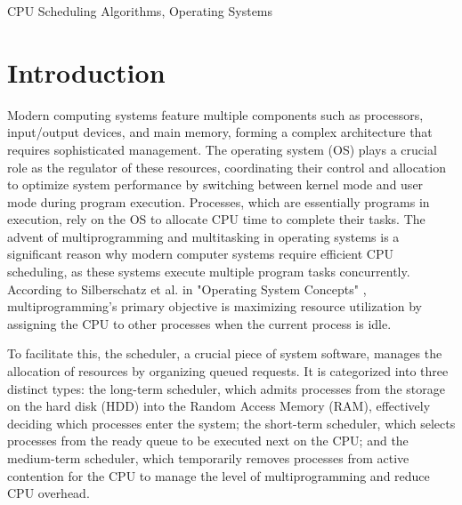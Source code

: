 \documentclass[conference]{IEEEtran}
\begin{document}
\begin{IEEEkeywords}
CPU Scheduling Algorithms, Operating Systems
\end{IEEEkeywords}

\section{\textbf{Introduction}}
Modern computing systems feature multiple components such as processors, input/output devices, and main memory, forming a complex architecture that requires sophisticated management. The operating system (OS) plays a crucial role as the regulator of these resources, coordinating their control and allocation to optimize system performance by switching between kernel mode and user mode during program execution\cite{fayyaz2017comparative}. Processes, which are essentially programs in execution, rely on the OS to allocate CPU time to complete their tasks. The advent of multiprogramming and multitasking in operating systems is a significant reason why modern computer systems require efficient CPU scheduling, as these systems execute multiple program tasks concurrently. According to Silberschatz et al. in "Operating System Concepts" \cite{silberschatz1991operating}, multiprogramming's primary objective is maximizing resource utilization by assigning the CPU to other processes when the current process is idle.

To facilitate this, the scheduler, a crucial piece of system software, manages the allocation of resources by organizing queued requests. It is categorized into three distinct types: the long-term scheduler, which admits processes from the storage on the hard disk (HDD) into the Random Access Memory (RAM), effectively deciding which processes enter the system; the short-term scheduler, which selects processes from the ready queue to be executed next on the CPU; and the medium-term scheduler, which temporarily removes processes from active contention for the CPU to manage the level of multiprogramming and reduce CPU overhead\cite{silberschatz1991operating}.
\end{document}
